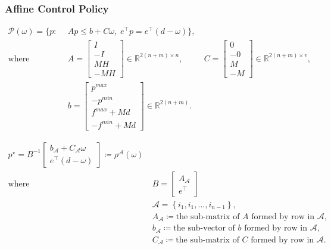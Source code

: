 \documentclass[11pt]{article}
\begin{document}
\subsubsection{Affine Control Policy}
\begin{align}\label{eq:opf_poly_compact}
\mathcal{P}\left ( \omega \right ) =  \{ p:
~ &~ Ap\leq b+C\omega, \; e^{\top }p=e^{\top }\left ( d -\omega  \right )  \}, \\
\text{where}
~ &~ A=\begin{bmatrix}I\\ -I\\ MH\\ -MH\end{bmatrix} \in \mathbb{R}^{2\left(n+m\right)\times n},
~ &~ C=\begin{bmatrix}0\\ -0\\ M\\ -M\end{bmatrix} \in \mathbb{R}^{2\left(n+m\right)\times v}, \nonumber \\
~ &~ b=\begin{bmatrix}p^{max}\\ -p^{min}\\ f^{max}+Md\\ -f^{min}+Md\end{bmatrix} \in \mathbb{R}^{2\left(n+m\right)}. \nonumber
\end{align}

\begin{align}\label{eq:opf_affine}
p^{\star}=B^{-1}\begin{bmatrix}
b_{\mathcal{A}}+C_{\mathcal{A}}\omega\\ 
e^{\top}\left(d-\omega\right)
\end{bmatrix} \coloneqq\rho^{\mathcal{A}}\left(\omega\right) \\
\text{where}
~ &~ B=\begin{bmatrix} A_{\mathcal{A}}\\ e^{\top} \end{bmatrix} \nonumber \\
~ &~ \mathcal{A} = \left \{ i_{1}, i_{1}, ..., i_{n-1} \right \}, \nonumber \\
~ &~ A_{\mathcal{A}} \coloneqq \text{the sub-matrix of } A \text{ formed by row in } \mathcal{A}, \nonumber \\
~ &~ b_{\mathcal{A}} \coloneqq \text{the sub-vector of } b \text{ formed by row in } \mathcal{A}, \nonumber \\
~ &~ C_{\mathcal{A}} \coloneqq \text{the sub-matrix of } C \text{ formed by row in } \mathcal{A}. \nonumber
\end{align}
\end{document}
